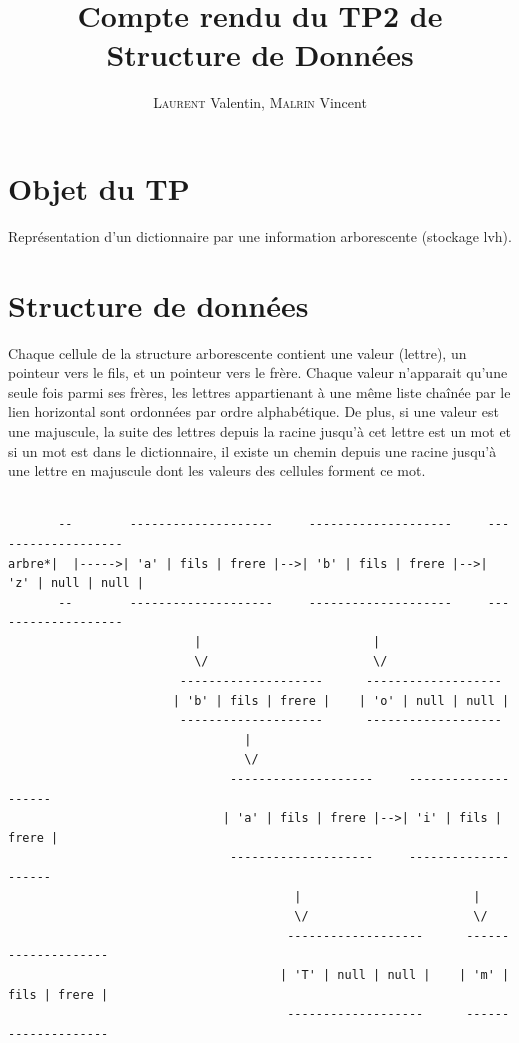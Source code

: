 \documentclass{report}
\title{Compte rendu du TP2 de Structure de Données}
\author{\textsc{Laurent} Valentin, \textsc{Malrin} Vincent}
\begin{document}
\maketitle

\tableofcontents

\setcounter{chapter}{1}
\newpage
\section{Objet du TP}\label{objet}
Représentation d'un dictionnaire par une information arborescente (stockage lvh).

\section{Structure de données}\label{sdd}
Chaque cellule de la structure arborescente contient une valeur (lettre),
un pointeur vers le fils, et un pointeur vers le frère.
Chaque valeur n'apparait qu'une seule fois parmi ses frères, les lettres appartienant
à une même liste chaînée par le lien horizontal sont ordonnées par ordre alphabétique.
De plus, si une valeur est une majuscule, la suite des lettres depuis la racine jusqu'à cet
lettre est un mot et si un mot est dans le dictionnaire, il existe un chemin depuis
une racine jusqu'à une lettre en majuscule dont les valeurs des cellules forment ce mot.

\begin{small}
\begin{verbatim}

       --        --------------------     --------------------     -------------------
arbre*|  |----->| 'a' | fils | frere |-->| 'b' | fils | frere |-->| 'z' | null | null |
       --        --------------------     --------------------     -------------------
                          |                        |
                          \/                       \/
                        --------------------      -------------------
                       | 'b' | fils | frere |    | 'o' | null | null | 
                        --------------------      -------------------
                                 |
                                 \/
                               --------------------     --------------------
                              | 'a' | fils | frere |-->| 'i' | fils | frere |
                               --------------------     --------------------
                                        |                        |
                                        \/                       \/
                                       -------------------      --------------------
                                      | 'T' | null | null |    | 'm' | fils | frere |
                                       -------------------      --------------------


\end{verbatim}
\end{small}
\end{document}
